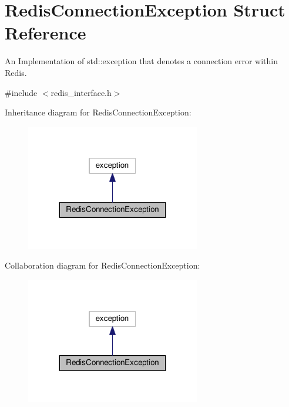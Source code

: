 \hypertarget{structRedisConnectionException}{}\section{Redis\+Connection\+Exception Struct Reference}
\label{structRedisConnectionException}


An Implementation of std\+::exception that denotes a connection error within Redis.  




{\ttfamily \#include $<$redis\+\_\+interface.\+h$>$}



Inheritance diagram for Redis\+Connection\+Exception\+:
\nopagebreak
\begin{figure}[H]
\begin{center}
\leavevmode
\includegraphics[width=215pt]{structRedisConnectionException__inherit__graph}
\end{center}
\end{figure}


Collaboration diagram for Redis\+Connection\+Exception\+:
\nopagebreak
\begin{figure}[H]
\begin{center}
\leavevmode
\includegraphics[width=215pt]{structRedisConnectionException__coll__graph}
\end{center}
\end{figure}
